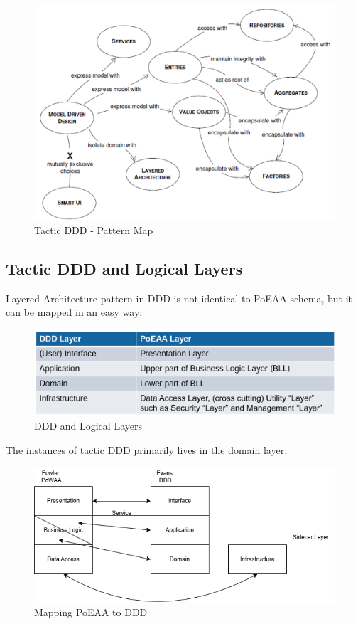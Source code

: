 \documentclass[../Main.tex]{subfiles}
\begin{document}
\begin{figure}[H]
    \centering
    \includegraphics[width=0.8\linewidth]{Images/patternmap-tactic-ddd.png}
    \caption{Tactic DDD - Pattern Map}
\end{figure}

\newpage
\subsection{Tactic DDD and Logical Layers}
Layered Architecture pattern in DDD is not identical to PoEAA schema, but
it can be mapped in an easy way:
\begin{figure}[H]
    \centering
    \includegraphics[width=1\linewidth]{Images/ddd-logical-layers.png}
    \caption{DDD and Logical Layers}
\end{figure}
The instances of tactic DDD primarily lives in the domain layer.
\begin{figure}[H]
    \centering
    \includegraphics[width=1\linewidth]{Images/mapping-poeaa-ddd.png}
    \caption{Mapping PoEAA to DDD}
\end{figure}
\end{document}
